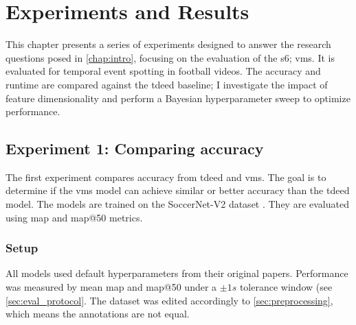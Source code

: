 \chapter{Experiments and Results}
\label{chap:experiments}
This chapter presents a series of experiments designed to answer the research questions posed in \autoref{chap:intro}, focusing on the evaluation of the \acrfull{s6}; \acrfull{vms}. It is evaluated for temporal event spotting in football videos. The accuracy and runtime are compared against the \acrfull{tdeed} baseline; I investigate the impact of feature dimensionality and perform a Bayesian hyperparameter sweep to optimize performance.


\section{Experiment 1: Comparing accuracy}
\label{sec:experiment1}
The first experiment compares accuracy from \acrfull{tdeed} and \acrfull{vms}. The goal is to determine if the \acrshort{vms} model can achieve similar or better accuracy than the \acrshort{tdeed} model. The models are trained on the SoccerNet-V2 dataset \cite{deliege_soccernet-v2_dataset_2021}. They are evaluated using \acrfull{map} and \acrshort{map}@50 metrics.

\subsection{Setup}
\label{ssec:ex1_setup}

All models used default hyperparameters from their original papers. Performance was measured by mean \acrfull{map} and \acrshort{map}@50 under a \(\pm1s\) tolerance window (see \cref{sec:eval_protocol}. The dataset was edited accordingly to \cref{sec:preprocessing}, which means the annotations are not equal. 


